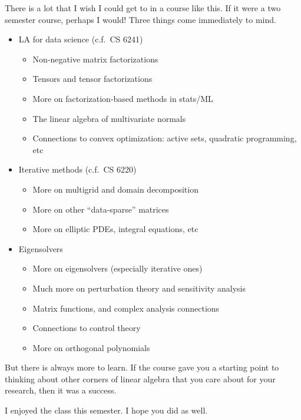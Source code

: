 \documentclass[12pt, leqno]{article} %
\begin{document}
There is a lot that I wish I could get to in a course like this.
If it were a two semester course, perhaps I would!  Three things
come immediately to mind.

\begin{itemize}
\item LA for data science (c.f.~CS 6241)
  \begin{itemize}
  \item Non-negative matrix factorizations
  \item Tensors and tensor factorizations
  \item More on factorization-based methods in stats/ML
  \item The linear algebra of multivariate normals
  \item Connections to convex optimization: active sets, quadratic programming, etc
  \end{itemize}
\item Iterative methods (c.f.~CS 6220)
  \begin{itemize}
  \item More on multigrid and domain decomposition
  \item More on other ``data-sparse'' matrices
  \item More on elliptic PDEs, integral equations, etc
  \end{itemize}
\item Eigensolvers
  \begin{itemize}
  \item More on eigensolvers (especially iterative ones)
  \item Much more on perturbation theory and sensitivity analysis
  \item Matrix functions, and complex analysis connections
  \item Connections to control theory
  \item More on orthogonal polynomials
  \end{itemize}
\end{itemize}

But there is always more to learn.  If the course gave you a starting
point to thinking about other corners of linear algebra that you care
about for your research, then it was a success.

I enjoyed the class this semester.  I hope you did as well.
\end{document}
